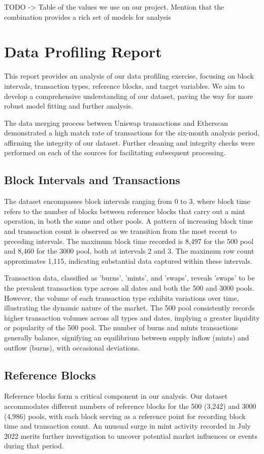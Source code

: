 \documentclass{article}
\begin{document}
TODO -> Table of the values we use on our project. Mention that the combination provides a rich set of models for analysis

\section*{Data Profiling Report}
This report provides an analysis of our data profiling exercise, focusing on block intervals, transaction types, reference blocks, and target variables. We aim to develop a comprehensive understanding of our dataset, paving the way for more robust model fitting and further analysis.

The data merging process between Uniswap transactions and Etherscan demonstrated a high match rate of transactions for the six-month analysis period, affirming the integrity of our dataset. Further cleaning and integrity checks were performed on each of the sources for facilitating subsequent processing.

\subsection{Block Intervals and Transactions}
The dataset encompasses block intervals ranging from 0 to 3, where block time refers to the number of blocks between reference blocks that carry out a mint operation, in both the same and other pools. A pattern of increasing block time and transaction count is observed as we transition from the most recent to preceding intervals. The maximum block time recorded is 8,497 for the 500 pool and 8,460 for the 3000 pool, both at intervals 2 and 3. The maximum row count approximates 1,115, indicating substantial data captured within these intervals.

Transaction data, classified as 'burns', 'mints', and 'swaps', reveals 'swaps' to be the prevalent transaction type across all dates and both the 500 and 3000 pools. However, the volume of each transaction type exhibits variations over time, illustrating the dynamic nature of the market. The 500 pool consistently records higher transaction volumes across all types and dates, implying a greater liquidity or popularity of the 500 pool. The number of burns and mints transactions generally balance, signifying an equilibrium between supply inflow (mints) and outflow (burns), with occasional deviations.

\subsection{Reference Blocks}
Reference blocks form a critical component in our analysis. Our dataset accommodates different numbers of reference blocks for the 500 (3,242) and 3000 (4,986) pools, with each block serving as a reference point for recording block time and transaction count. An unusual surge in mint activity recorded in July 2022 merits further investigation to uncover potential market influences or events during that period.
\end{document}
